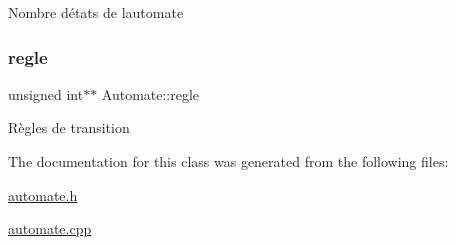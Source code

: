 Nombre d\textquotesingle{}états de l\textquotesingle{}automate \mbox{\label{class_automate_a7f9e28d421ef41372273778f182e8f22}} 
\subsubsection{\texorpdfstring{regle}{regle}}
{\footnotesize\ttfamily unsigned int$\ast$$\ast$ Automate\+::regle\hspace{0.3cm}{\ttfamily [protected]}}

Règles de transition 

The documentation for this class was generated from the following files\+:\begin{DoxyCompactItemize}
\item 
\mbox{\hyperlink{automate_8h}{automate.\+h}}\item 
\mbox{\hyperlink{automate_8cpp}{automate.\+cpp}}\end{DoxyCompactItemize}

